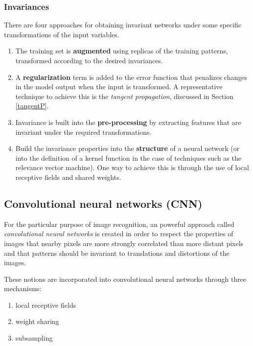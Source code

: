 \documentclass[a4paper]{report}
\newcommand{\imp}[1]{{\color{blue}\textit{#1}}}
\begin{document}
\subsubsection{Invariances}
There are four approaches for obtaining invariant networks under some specific transformations of the input variables.
\begin{enumerate}
	\item The training set is \textbf{augmented} using replicas of the training patterns, transformed according to the desired invariances.
	\item A \textbf{regularization} term is added to the error function that penalizes changes in the model output when the input is transformed. A representative technique to achieve this is the \imp{tangent propagation}, discussed in Section \ref{tangentP}.
	\item Invariance is built into the \textbf{pre-processing} by extracting features that are invariant under the required transformations.
	\item Build the invariance properties into the \textbf{structure} of a neural network (or into the definition of a kernel function in the case of techniques such as the relevance vector machine). One way to achieve this is through the use of local receptive fields and shared weights.
\end{enumerate}
\subsection{Convolutional neural networks (CNN)}
For the particular purpose of image recognition, an powerful approach called \imp{convolutional neural networks} is created in order to respect the properties of images that nearby pixels are more strongly correlated than more distant pixels and that patterns should be invariant to translations and distortions of the images.

These notions are incorporated into convolutional neural networks through three mechanisms: 
\begin{enumerate}
	\item local receptive fields
	\item weight sharing
	\item subsampling
\end{enumerate}
\end{document}

